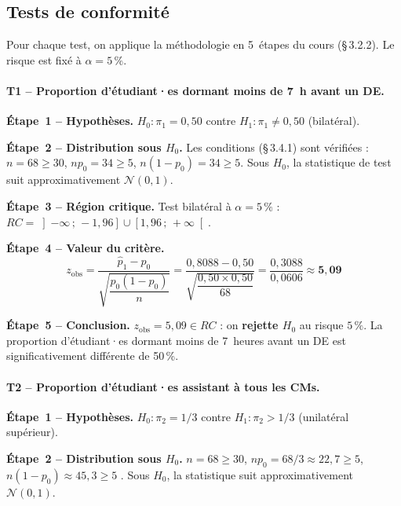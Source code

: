
\subsection{Tests de conformité}

Pour chaque test, on applique la méthodologie en 5~étapes du cours (§\,3.2.2).
Le risque est fixé à $\alpha = 5\,\%$.

\paragraph{T1 -- Proportion d'étudiant·es dormant moins de 7~h avant un DE.}

\textbf{Étape~1 -- Hypothèses.}
$H_0 : \pi_1 = 0{,}50$ contre $H_1 : \pi_1 \neq 0{,}50$ (bilatéral).

\textbf{Étape~2 -- Distribution sous $H_0$.}
Les conditions (§\,3.4.1) sont vérifiées : $n = 68 \geq 30$,
$np_0 = 34 \geq 5$, $n(1-p_0) = 34 \geq 5$.
Sous $H_0$, la statistique de test suit approximativement $\mathcal{N}(0,1)$.

\textbf{Étape~3 -- Région critique.}
Test bilatéral à $\alpha = 5\,\%$ : $RC = \left]-\infty\,;\,-1{,}96\right] \cup \left[1{,}96\,;\,+\infty\right[$.

\textbf{Étape~4 -- Valeur du critère.}
\[
  z_\text{obs}
  = \frac{\hat{p}_1 - p_0}{\sqrt{\dfrac{p_0(1-p_0)}{n}}}
  = \frac{0{,}8088 - 0{,}50}{\sqrt{\dfrac{0{,}50 \times 0{,}50}{68}}}
  = \frac{0{,}3088}{0{,}0606}
  \approx \mathbf{5{,}09}
\]

\textbf{Étape~5 -- Conclusion.}
$z_\text{obs} = 5{,}09 \in RC$ : on \textbf{rejette $H_0$} au risque $5\,\%$.
La proportion d'étudiant·es dormant moins de 7~heures avant un DE est
significativement différente de 50\,\%.

\paragraph{T2 -- Proportion d'étudiant·es assistant à tous les CMs.}

\textbf{Étape~1 -- Hypothèses.}
$H_0 : \pi_2 = 1/3$ contre $H_1 : \pi_2 > 1/3$ (unilatéral supérieur).

\textbf{Étape~2 -- Distribution sous $H_0$.}
$n = 68 \geq 30$, $np_0 = 68/3 \approx 22{,}7 \geq 5$,
$n(1-p_0) \approx 45{,}3 \geq 5$ {\checkmark}.
Sous $H_0$, la statistique suit approximativement $\mathcal{N}(0,1)$.

